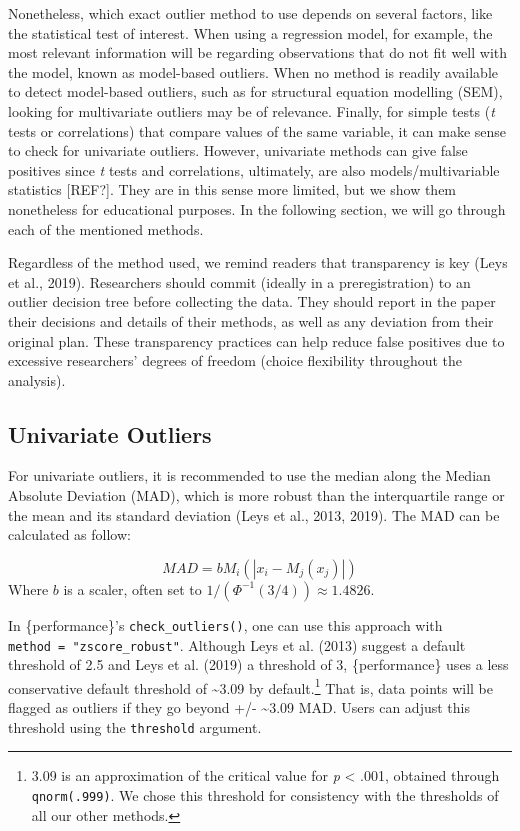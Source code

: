 \documentclass[
]{article}
\begin{document}
Nonetheless, which exact outlier method to use depends on several factors, like the statistical test of interest. When using a regression model, for example, the most relevant information will be regarding observations that do not fit well with the model, known as model-based outliers. When no method is readily available to detect model-based outliers, such as for structural equation modelling (SEM), looking for multivariate outliers may be of relevance. Finally, for simple tests (\emph{t} tests or correlations) that compare values of the same variable, it can make sense to check for univariate outliers. However, univariate methods can give false positives since \emph{t} tests and correlations, ultimately, are also models/multivariable statistics {[}REF?{]}. They are in this sense more limited, but we show them nonetheless for educational purposes. In the following section, we will go through each of the mentioned methods.

Regardless of the method used, we remind readers that transparency is key (Leys et al., 2019). Researchers should commit (ideally in a preregistration) to an outlier decision tree before collecting the data. They should report in the paper their decisions and details of their methods, as well as any deviation from their original plan. These transparency practices can help reduce false positives due to excessive researchers' degrees of freedom (choice flexibility throughout the analysis).

\hypertarget{univariate-outliers}{%
\subsection{Univariate Outliers}\label{univariate-outliers}}

For univariate outliers, it is recommended to use the median along the Median Absolute Deviation (MAD), which is more robust than the interquartile range or the mean and its standard deviation (Leys et al., 2013, 2019). The MAD can be calculated as follow:

\[
MAD = b M_i(|x_i-M_j(x_j)|)
\]
Where \(b\) is a scaler, often set to \(1/\left(\Phi ^{-1}(3/4)\right)\approx 1.4826\).

In \{performance\}'s \texttt{check\_outliers()}, one can use this approach with \texttt{method\ =\ "zscore\_robust"}. Although Leys et al. (2013) suggest a default threshold of 2.5 and Leys et al. (2019) a threshold of 3, \{performance\} uses a less conservative default threshold of \textasciitilde3.09 by default.\footnote{ 3.09 is an approximation of the critical value for \emph{p} \textless{} .001, obtained through \texttt{qnorm(.999)}. We chose this threshold for consistency with the thresholds of all our other methods.} That is, data points will be flagged as outliers if they go beyond +/- \textasciitilde3.09 MAD. Users can adjust this threshold using the \texttt{threshold} argument.
\end{document}
